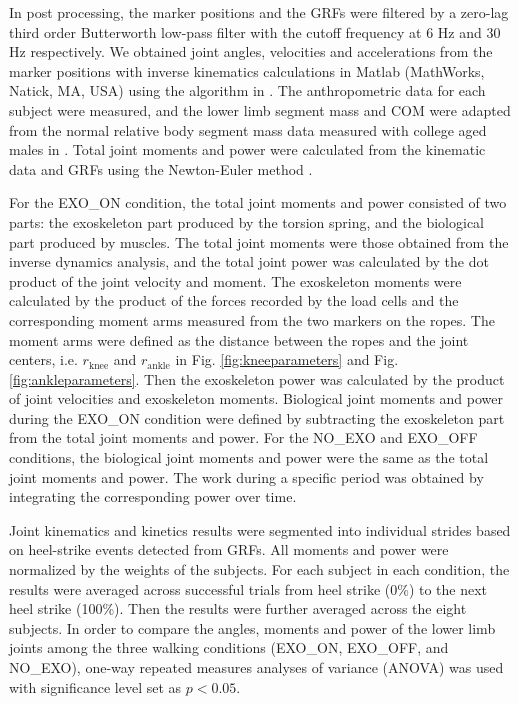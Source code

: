 \documentclass[10pt]{asme2ej}
\begin{document}
In post processing, the marker positions and the GRFs were filtered by a zero-lag third order Butterworth low-pass filter with the cutoff frequency at 6 Hz and 30 Hz respectively.
We obtained joint angles, velocities and accelerations from the marker positions with inverse kinematics calculations in Matlab (MathWorks, Natick, MA, USA) using the algorithm in \cite{RN24}.
The anthropometric data for each subject were measured, and the lower limb segment mass and COM were adapted from the normal relative body segment mass data measured with college aged males in \cite{de1996adjustments}.
Total joint moments and power were calculated from the kinematic data and GRFs using the Newton-Euler method \cite{kane1985dynamics}.

For the EXO\_ON condition, the total joint moments and power consisted of two parts: the exoskeleton part produced by the torsion spring, and the biological part produced by muscles.
The total joint moments were those obtained from the inverse dynamics analysis, and the total joint power was calculated by the dot product of the joint velocity and moment.
The exoskeleton moments were calculated by the product of the forces recorded by the load cells and the corresponding moment arms measured from the two markers on the ropes.
The moment arms were defined as the distance between the ropes and the joint centers, i.e. $r_\mathrm{knee}$ and $r_\mathrm{ankle}$ in Fig. \ref{fig:kneeparameters} and Fig. \ref{fig:ankleparameters}.
Then the exoskeleton power was calculated by the product of joint velocities and exoskeleton moments.
Biological joint moments and power during the EXO\_ON condition were defined by subtracting the exoskeleton part from the total joint moments and power.
For the NO\_EXO and EXO\_OFF conditions, the biological joint moments and power were the same as the total joint moments and power.
The work during a specific period was obtained by integrating the corresponding power over time.

Joint kinematics and kinetics results were segmented into individual strides based on heel-strike events detected from GRFs.
All moments and power were normalized by the weights of the subjects.
For each subject in each condition, the results were averaged across successful trials from heel strike (0\%) to the next heel strike (100\%).
Then the results were further averaged across the eight subjects.
In order to compare the angles, moments and power of the lower limb joints among the three walking conditions (EXO\_ON, EXO\_OFF, and NO\_EXO), one-way repeated measures analyses of variance (ANOVA) was used with significance level set as $p<0.05$.
\end{document}
